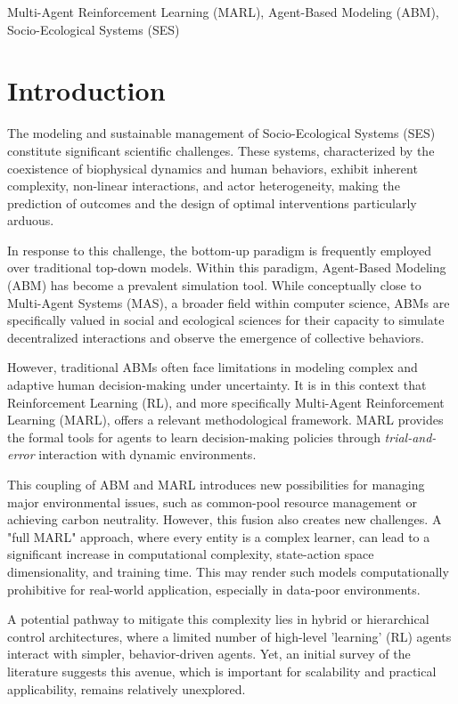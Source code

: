 \documentclass[conference]{IEEEtran}
\begin{document}
\begin{IEEEkeywords}
Multi-Agent Reinforcement Learning (MARL), Agent-Based Modeling (ABM), Socio-Ecological Systems (SES)
\end{IEEEkeywords}

\section{Introduction}
The modeling and sustainable management of Socio-Ecological Systems (SES) constitute significant scientific challenges. These systems, characterized by the coexistence of biophysical dynamics and human behaviors, exhibit inherent complexity, non-linear interactions, and actor heterogeneity, making the prediction of outcomes and the design of optimal interventions particularly arduous.

In response to this challenge, the bottom-up paradigm is frequently employed over traditional top-down models. Within this paradigm, Agent-Based Modeling (ABM) has become a prevalent simulation tool. While conceptually close to Multi-Agent Systems (MAS), a broader field within computer science, ABMs are specifically valued in social and ecological sciences for their capacity to simulate decentralized interactions and observe the emergence of collective behaviors.

However, traditional ABMs often face limitations in modeling complex and adaptive human decision-making under uncertainty. It is in this context that Reinforcement Learning (RL), and more specifically Multi-Agent Reinforcement Learning (MARL), offers a relevant methodological framework. MARL provides the formal tools for agents to learn decision-making policies through \textit{trial-and-error} interaction with dynamic environments.

This coupling of ABM and MARL introduces new possibilities for managing major environmental issues, such as common-pool resource management or achieving carbon neutrality. However, this fusion also creates new challenges. A "full MARL" approach, where every entity is a complex learner, can lead to a significant increase in computational complexity, state-action space dimensionality, and training time. This may render such models computationally prohibitive for real-world application, especially in data-poor environments.

A potential pathway to mitigate this complexity lies in hybrid or hierarchical control architectures, where a limited number of high-level 'learning' (RL) agents interact with simpler, behavior-driven agents. Yet, an initial survey of the literature suggests this avenue, which is important for scalability and practical applicability, remains relatively unexplored.
\end{document}
